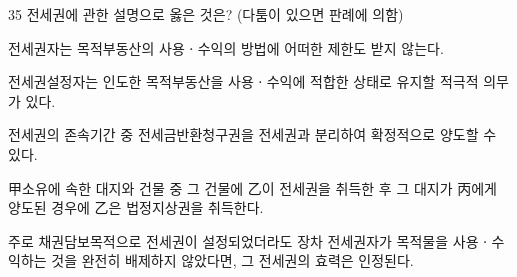 \begin{question}{35}
전세권에 관한 설명으로 옳은 것은? (다툼이 있으면 판례에 의함)
\begin{choices}
  \item 전세권자는 목적부동산의 사용ㆍ수익의 방법에 어떠한 제한도 받지 않는다.
  \item 전세권설정자는 인도한 목적부동산을 사용ㆍ수익에 적합한 상태로 유지할 적극적 의무가 있다.
  \item 전세권의 존속기간 중 전세금반환청구권을 전세권과 분리하여 확정적으로 양도할 수 있다.
  \item 甲소유에 속한 대지와 건물 중 그 건물에 乙이 전세권을 취득한 후 그 대지가 丙에게 양도된 경우에 乙은 법정지상권을 취득한다.
  \item 주로 채권담보목적으로 전세권이 설정되었더라도 장차 전세권자가 목적물을 사용ㆍ수익하는 것을 완전히 배제하지 않았다면, 그 전세권의 효력은 인정된다.
\end{choices}
\end{question}
